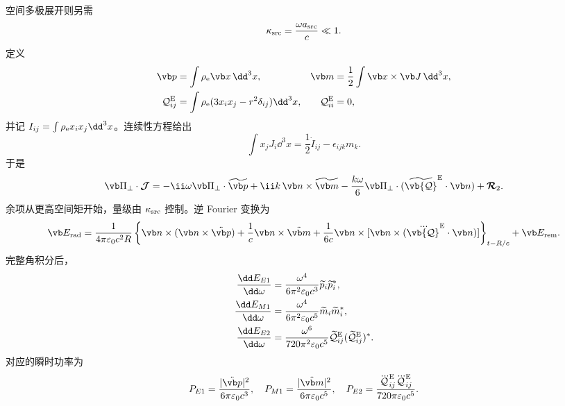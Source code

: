 空间多极展开则另需
\begin{equation}
 \kappa_{\rm src}=\frac{\omega a_{\rm src}}{c}\ll1 .
 \label{eq:phys-rr-multipole-control}
\end{equation}
定义
\begin{align}
 \vb p&=\int\rho_{\rm e}\vb x\,\dd^3x,
 &\vb m&=\frac12\int\vb x\times\vb J\,\dd^3x,
 \label{eq:phys-rr-dipole-defs}\\
 \mathcal Q^{\rm E}_{ij}
 &=\int\rho_{\rm e}(3x_ix_j-r^2\delta_{ij})\dd^3x,
 &\mathcal Q^{\rm E}_{ii}&=0 ,
 \label{eq:phys-rr-quadrupole-def}
\end{align}
并记 \(I_{ij}=\int\rho_{\rm e}x_ix_j\dd^3x\)。连续性方程给出
\begin{equation}
 \int x_jJ_i\dd^3x=\frac12\dot I_{ij}-\epsilon_{ijk}m_k .
 \label{eq:phys-rr-first-current-moment}
\end{equation}
于是
\begin{equation}
 \vb\Pi_\perp\cdot\boldsymbol{\mathcal J}
 =-\ii\omega\vb\Pi_\perp\cdot\widetilde{\vb p}
 +\ii k\,\vb n\times\widetilde{\vb m}
 -\frac{k\omega}{6}\vb\Pi_\perp\cdot
 (\widetilde{\vb{\mathcal Q}}^{\rm E}\cdot\vb n)
 +\boldsymbol{\mathcal R}_2 .
 \label{eq:phys-rr-multipole-current-amplitude}
\end{equation}
余项从更高空间矩开始，量级由 \(\kappa_{\rm src}\) 控制。逆 Fourier 变换为
\begin{equation}
 \vb E_{\rm rad}
 =\frac{1}{4\pi\varepsilon_0c^2R}
 \left\{\vb n\times(\vb n\times\ddot{\vb p})
 +\frac1c\vb n\times\ddot{\vb m}
 +\frac1{6c}\vb n\times[
 \vb n\times(\dddot{\vb{\mathcal Q}}^{\rm E}\cdot\vb n)]
 \right\}_{t-R/c}+\vb E_{\rm rem}.
 \label{eq:phys-rr-multipole-far-field}
\end{equation}
完整角积分后，
\begin{align}
 \frac{\dd E_{E1}}{\dd\omega}
 &=\frac{\omega^4}{6\pi^2\varepsilon_0c^3}
 \widetilde p_i\widetilde p_i^*,
 \label{eq:phys-rr-e1-spectrum}\\
 \frac{\dd E_{M1}}{\dd\omega}
 &=\frac{\omega^4}{6\pi^2\varepsilon_0c^5}
 \widetilde m_i\widetilde m_i^*,
 \label{eq:phys-rr-m1-spectrum}\\
 \frac{\dd E_{E2}}{\dd\omega}
 &=\frac{\omega^6}{720\pi^2\varepsilon_0c^5}
 \widetilde{\mathcal Q}^{\rm E}_{ij}
 (\widetilde{\mathcal Q}^{\rm E}_{ij})^* .
 \label{eq:phys-rr-e2-spectrum}
\end{align}
对应的瞬时功率为
\begin{equation}
 P_{E1}=\frac{|\ddot{\vb p}|^2}{6\pi\varepsilon_0c^3},
 \quad
 P_{M1}=\frac{|\ddot{\vb m}|^2}{6\pi\varepsilon_0c^5},
 \quad
 P_{E2}=\frac{\dddot{\mathcal Q}^{\rm E}_{ij}
 \dddot{\mathcal Q}^{\rm E}_{ij}}{720\pi\varepsilon_0c^5}.
 \label{eq:phys-rr-multipole-time-powers}
\end{equation}

